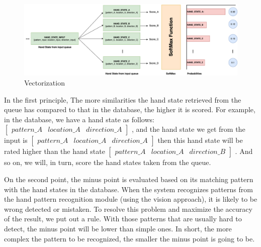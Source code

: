 \begin{figure}[H]
  \centering
  \includegraphics[width=\textwidth]{img/Chap4/Vectorization.png}
  \caption{ Vectorization }
  \label{fig:Chap4-Vectorization}
\end{figure}
In the first principle, The more similarities the hand state retrieved from the queue has compared to that in the database, the higher it is scored. For example, in the database, we have a hand state as follows: 
$\begin{bmatrix}
  pattern \_ A & location \_ A & direction \_ A
\end{bmatrix}$
, and the hand state we get from the input is 
$\begin{bmatrix}
  pattern \_ A & location \_ A & direction \_ A
\end{bmatrix}$
then this hand state will be rated higher than the hand state 
$\begin{bmatrix}
  pattern \_ A & location \_ A & direction \_ B
\end{bmatrix}$
. And so on, we will, in turn, score the hand states taken from the queue.

On the second point, the minus point is evaluated based on its matching pattern with the hand states in the database. When the system recognizes patterns from the hand pattern recognition module (using the vision approach), it is likely to be wrong detected or mistaken. To resolve this problem and maximize the accuracy of the result, we put out a rule. With those patterns that are usually hard to detect, the minus point will be lower than simple ones. In short, the more complex the pattern to be recognized, the smaller the minus point is going to be.

      
